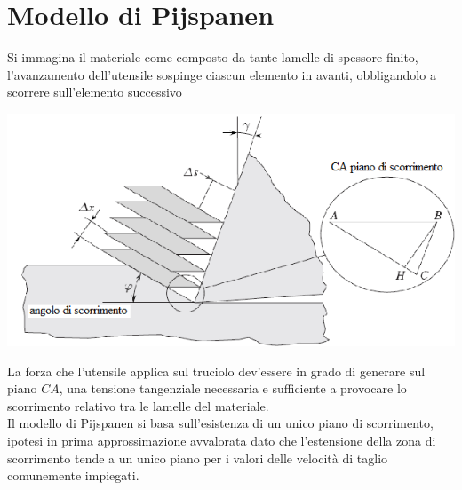 \documentclass[a4paper, 15pt]{article}
\begin{document}
	\section{Modello di Pijspanen}
	Si immagina il materiale come composto da tante lamelle di spessore finito, l'avanzamento dell'utensile sospinge ciascun elemento in avanti, obbligandolo a scorrere sull'elemento successivo
\begin{center}
	\includegraphics[width=0.5\linewidth]{figures/asp5}
\end{center}
	La forza che l'utensile applica sul truciolo dev'essere  in grado di generare sul piano $CA$, una tensione tangenziale necessaria e sufficiente a provocare lo scorrimento relativo tra le lamelle del materiale.\\
	
	Il modello di Pijspanen si basa sull'esistenza di un unico piano di
	scorrimento, ipotesi in prima approssimazione avvalorata dato che l'estensione della zona di scorrimento tende a un unico piano per i valori delle
	velocità di taglio comunemente impiegati.\\
	
\end{document}
